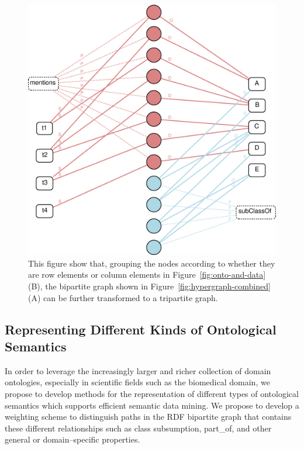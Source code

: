 \begin{figure}[tbh]
\begin{center}
\includegraphics[width=.6\textwidth]{fig/hypergraph_mining-bipartite-weighted.eps}
\end{center}
\caption{\label{fig:bipartitegraph-weighted} This figure show that, grouping the nodes according to whether they are row elements or column elements in Figure~\ref{fig:onto-and-data} (B), the bipartite graph shown in Figure~\ref{fig:hypergraph-combined} (A) can be further transformed to a tripartite graph.}
\end{figure}

\subsection{Representing Different Kinds of Ontological Semantics}
\label{sec:rosg}


In order to leverage the increasingly larger and richer collection of domain ontologies, especially in scientific fields such as the biomedical domain, we propose to develop methods for the representation of different types of ontological semantics which supports efficient semantic data mining. We propose to develop a weighting scheme to distinguish paths in the RDF bipartite graph that contains these different relationships such as class subsumption, part\_of, and other general or domain--specific properties. %

